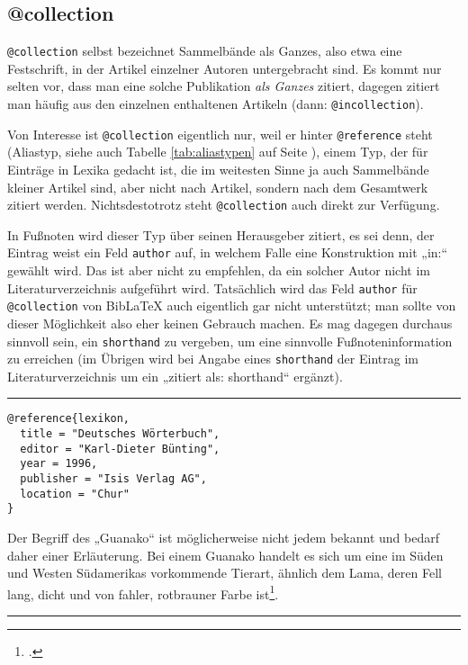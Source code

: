 \documentclass[11pt,a4paper,DIV=calc]{scrartcl}
\newcommand\software[1]{\textsf{#1}}
\newcommand\Biblatex{\software{Bib\LaTeX{}}\xspace}
\newenvironment{rubexample}{\par\vspace{\baselineskip}\hrule\par\begin{refsection}}{\end{refsection}\par\hrule\par\vspace{\baselineskip}}
\begin{document}
\subsection{@collection}

\verb+@collection+ selbst bezeichnet Sammelbände als Ganzes, also etwa
eine Festschrift, in der Artikel einzelner Autoren untergebracht
sind. Es kommt nur selten vor, dass man eine solche Publikation
\emph{als Ganzes} zitiert, dagegen zitiert man häufig aus den
einzelnen enthaltenen Artikeln (dann:
\verb+@incollection+).

Von Interesse ist \verb+@collection+ eigentlich nur, weil er hinter
\verb+@reference+ steht (Aliastyp, siehe auch Tabelle
\ref{tab:aliastypen} auf Seite \pageref{tab:aliastypen}), einem Typ,
der für Einträge in Lexika gedacht ist, die im weitesten Sinne ja auch
Sammelbände kleiner Artikel sind, aber nicht nach Artikel, sondern
nach dem Gesamtwerk zitiert werden. Nichtsdestotrotz steht
\verb+@collection+ auch direkt zur Verfügung.

In Fußnoten wird dieser Typ über seinen Herausgeber zitiert, es sei
denn, der Eintrag weist ein Feld \verb+author+ auf, in welchem Falle
eine Konstruktion mit „in:“ gewählt wird. Das ist aber nicht zu
empfehlen, da ein solcher Autor nicht im Literaturverzeichnis
aufgeführt wird. Tatsächlich wird das Feld \verb+author+ für
\verb+@collection+ von \Biblatex auch eigentlich gar nicht
unterstützt; man sollte von dieser Möglichkeit also eher keinen
Gebrauch machen. Es mag dagegen durchaus sinnvoll sein, ein
\verb+shorthand+ zu vergeben, um eine sinnvolle Fußnoteninformation zu
erreichen (im Übrigen wird bei Angabe eines \verb+shorthand+ der
Eintrag im Literaturverzeichnis um ein „zitiert als: shorthand“ ergänzt).

\begin{rubexample}
\begin{verbatim}
@reference{lexikon,
  title = "Deutsches Wörterbuch",
  editor = "Karl-Dieter Bünting",
  year = 1996,
  publisher = "Isis Verlag AG",
  location = "Chur"
}
\end{verbatim}

Der Begriff des „Guanako“ ist möglicherweise nicht jedem bekannt und
bedarf daher einer Erläuterung. Bei einem Guanako handelt es sich um
eine im Süden und Westen Südamerikas vorkommende Tierart, ähnlich dem
Lama, deren Fell lang, dicht und von fahler, rotbrauner Farbe
ist\footcite[480]{lexikon}.

\printbibliography
\end{rubexample}
\end{document}
